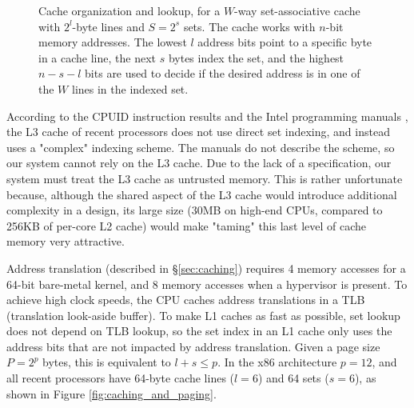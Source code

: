 \begin{figure}[hbtp]
  \caption{
    Cache organization and lookup, for a $W$-way set-associative cache with
    $2^{l}$-byte lines and $S = 2^{s}$ sets. The cache works with $n$-bit
    memory addresses. The lowest $l$ address bits point to a specific byte in a
    cache line, the next $s$ bytes index the set, and the highest $n - s - l$
    bits are used to decide if the desired address is in one of the $W$ lines
    in the indexed set.
  }
  \label{fig:cpu_cache}
\end{figure}

According to the CPUID instruction results and the Intel programming manuals
\cite{intel2013manual}, the L3 cache of recent processors does not use direct
set indexing, and instead uses a "complex" indexing scheme. The manuals do not
describe the scheme, so our system cannot rely on the L3 cache. Due to the lack
of a specification, our system must treat the L3 cache as untrusted memory.
This is rather unfortunate because, although the shared aspect of the L3 cache
would introduce additional complexity in a design, its large size (30MB on
high-end CPUs, compared to 256KB of per-core L2 cache) would make "taming" this
last level of cache memory very attractive.

Address translation (described in \S \ref{sec:caching}) requires 4 memory
accesses for a 64-bit bare-metal kernel, and 8 memory accesses when a
hypervisor is present. To achieve high clock speeds, the CPU caches address
translations in a TLB (translation look-aside buffer). To make L1 caches as
fast as possible, set lookup does not depend on TLB lookup, so the set index in
an L1 cache only uses the address bits that are not impacted by address
translation. Given a page size $P = 2^{p}$ bytes, this is equivalent to
$l + s \le p$. In the x86 architecture $p = 12$, and all recent processors have
64-byte cache lines ($l = 6$) and 64 sets ($s = 6$), as shown in Figure
\ref{fig:caching_and_paging}.

